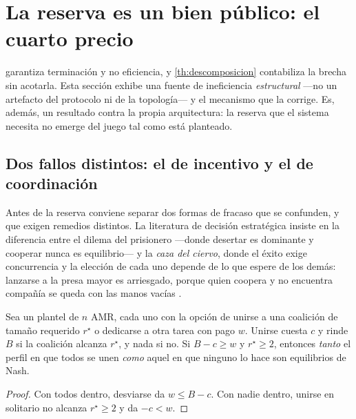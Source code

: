 \section{La reserva es un bien público: el cuarto precio}
\label{sec:standby}

 garantiza terminación y no eficiencia, y
\cref{th:descomposicion} contabiliza la brecha sin acotarla. Esta sección
exhibe una fuente de ineficiencia \emph{estructural} —no un artefacto del
protocolo ni de la topología— y el mecanismo que la corrige. Es, además, un
resultado contra la propia arquitectura: la reserva que el sistema necesita no
emerge del juego tal como está planteado.

\subsection{Dos fallos distintos: el de incentivo y el de coordinación}

Antes de la reserva conviene separar dos formas de fracaso que se confunden, y
que exigen remedios distintos. La literatura de decisión estratégica insiste en
la diferencia entre el dilema del prisionero —donde desertar es dominante y
cooperar nunca es equilibrio— y la \emph{caza del ciervo}, donde el éxito exige
concurrencia y la elección de cada uno depende de lo que espere de los demás:
lanzarse a la presa mayor es arriesgado, porque quien coopera y no encuentra
compañía se queda con las manos vacías \cite{weiss2023games}.

\begin{proposicion}
\label{pr:caza-ciervo}
Sea un plantel de $n$ AMR, cada uno con la opción de unirse a una coalición de
tamaño requerido $r^\star$ o dedicarse a otra tarea con pago $w$. Unirse cuesta
$c$ y rinde $B$ si la coalición alcanza $r^\star$, y nada si no. Si
$B-c\ge w$ y $r^\star\ge2$, entonces \emph{tanto} el perfil en que todos se unen
\emph{como} aquel en que ninguno lo hace son equilibrios de Nash.
\end{proposicion}

\begin{proof}
Con todos dentro, desviarse da $w\le B-c$. Con nadie dentro, unirse en solitario
no alcanza $r^\star\ge2$ y da $-c<w$.
\end{proof}

